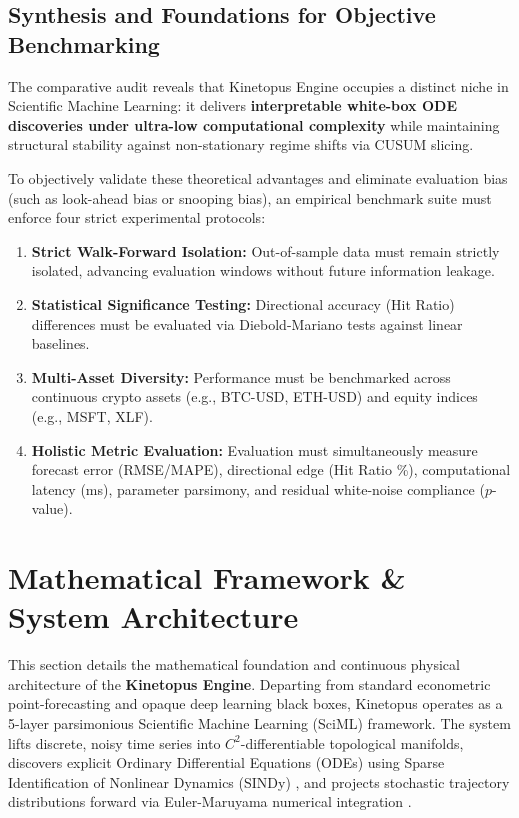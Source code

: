 \documentclass[11pt,a4paper]{article}
\begin{document}
\subsection{Synthesis and Foundations for Objective Benchmarking}

The comparative audit reveals that Kinetopus Engine occupies a distinct niche in Scientific Machine Learning: it delivers \textbf{interpretable white-box ODE discoveries under ultra-low computational complexity} while maintaining structural stability against non-stationary regime shifts via CUSUM slicing.

To objectively validate these theoretical advantages and eliminate evaluation bias (such as look-ahead bias or snooping bias), an empirical benchmark suite must enforce four strict experimental protocols:
\begin{enumerate}[leftmargin=1.5em]
    \item \textbf{Strict Walk-Forward Isolation:} Out-of-sample data must remain strictly isolated, advancing evaluation windows without future information leakage.
    \item \textbf{Statistical Significance Testing:} Directional accuracy (Hit Ratio) differences must be evaluated via Diebold-Mariano tests \cite{diebold1995comparing} against linear baselines.
    \item \textbf{Multi-Asset Diversity:} Performance must be benchmarked across continuous crypto assets (e.g., BTC-USD, ETH-USD) and equity indices (e.g., MSFT, XLF).
    \item \textbf{Holistic Metric Evaluation:} Evaluation must simultaneously measure forecast error (RMSE/MAPE), directional edge (Hit Ratio \%), computational latency (ms), parameter parsimony, and residual white-noise compliance ($p$-value).
\end{enumerate}

\section{Mathematical Framework \& System Architecture}
\label{sec:methodology}

This section details the mathematical foundation and continuous physical architecture of the \textbf{Kinetopus Engine}. Departing from standard econometric point-forecasting and opaque deep learning black boxes, Kinetopus operates as a 5-layer parsimonious Scientific Machine Learning (SciML) framework. The system lifts discrete, noisy time series into $C^2$-differentiable topological manifolds, discovers explicit Ordinary Differential Equations (ODEs) using Sparse Identification of Nonlinear Dynamics (SINDy) \cite{brunton2016discovering}, and projects stochastic trajectory distributions forward via Euler-Maruyama numerical integration \cite{maruyama1955continuous}.
\end{document}
